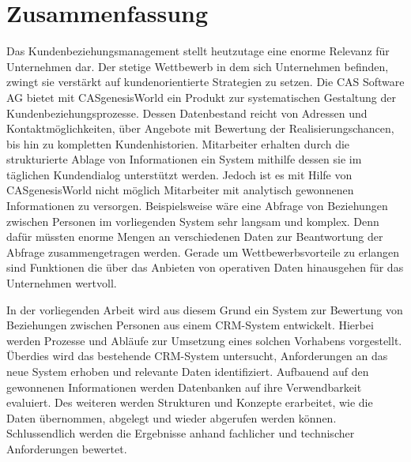 
\chapter*{\centering Zusammenfassung}


Das Kundenbeziehungsmanagement stellt heutzutage eine enorme Relevanz für Unternehmen dar. Der stetige Wettbewerb in dem sich Unternehmen
befinden, zwingt sie verstärkt auf kundenorientierte Strategien zu setzen. Die CAS Software AG bietet mit CASgenesisWorld ein Produkt zur systematischen Gestaltung der Kundenbeziehungsprozesse. Dessen Datenbestand reicht von Adressen und Kontaktmöglichkeiten, über Angebote mit Bewertung der Realisierungschancen, bis hin zu kompletten Kundenhistorien. Mitarbeiter erhalten durch die strukturierte Ablage von Informationen ein System mithilfe dessen sie im täglichen Kundendialog unterstützt werden. Jedoch ist es mit Hilfe von CASgenesisWorld nicht möglich Mitarbeiter mit analytisch gewonnenen Informationen zu versorgen. Beispielsweise wäre eine Abfrage von Beziehungen zwischen Personen im vorliegenden System sehr langsam und komplex. Denn dafür müssten enorme Mengen an verschiedenen Daten zur Beantwortung der Abfrage zusammengetragen werden. Gerade um Wettbewerbsvorteile zu erlangen sind Funktionen die über das Anbieten von operativen Daten hinausgehen für das Unternehmen wertvoll.      

In der vorliegenden Arbeit wird aus diesem Grund ein System zur Bewertung von Beziehungen zwischen Personen aus einem CRM-System entwickelt. Hierbei werden Prozesse und Abläufe zur Umsetzung eines solchen Vorhabens vorgestellt. Überdies wird das bestehende CRM-System untersucht, Anforderungen an das neue System erhoben und relevante Daten identifiziert. Aufbauend auf den gewonnenen Informationen werden Datenbanken auf ihre Verwendbarkeit evaluiert. Des weiteren werden Strukturen und Konzepte erarbeitet, wie die Daten übernommen, abgelegt und wieder abgerufen werden können. Schlussendlich werden die Ergebnisse anhand fachlicher und technischer Anforderungen bewertet.